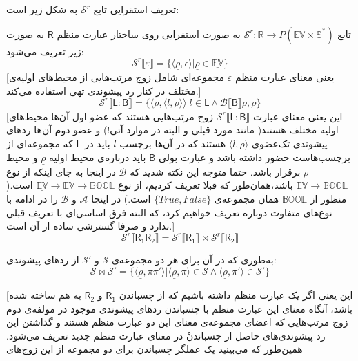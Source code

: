 تعریف استقرایی تابع 
$\mathcal{S}^r$
به شکل زیر است:
\begin{defn}
	تابع 
	$\mathcal{S}^r:\mathbb{R}\rightarrow \mathit{P}(\mathbb{\underline{EV}\times S}^*)$
	به صورت استقرایی روی ساختار عبارت منظم $\mathsf{R}$ به صورت زیر تعریف می‌شود:
$$\mathcal{S}^r\llbracket\varepsilon\rrbracket= \{ \langle \underline{\rho} , \epsilon \rangle | \underline{\rho} \in \underline{\mathbb{EV}}\}$$
[یعنی معنای عبارت منظم
$\varepsilon$
مجموعه‌ای شامل زوج مرتب‌هایی از محیط‌های اولیه‌ی مختلف در کنار رد پیشوندی تهی استفاده می‌کند.]
$$\mathcal{S}^r\llbracket\mathsf{L:B}\rrbracket = \{\langle\underline{\rho},\langle l , \rho \rangle \rangle | l \in \mathsf{L} \land \mathcal{B}\llbracket\mathsf{B}\rrbracket \underline{\rho},\rho \}$$
[این یعنی معنای عبارت 
$\mathcal{S}^r\llbracket\mathsf{L:B}\rrbracket$
زوج مرتب‌هایی هستند که عضو اول آن‌ها محیط‌های اولیه مختلف هستند( مانند مورد قبلی و البته در موارد آتی!) و عضو دوم آن‌ها ردهای پیشوندی تک‌عضوی 
$\langle l , \rho \rangle$
هستند که در آن‌ها برچسب 
$l$
باید در
$\mathsf{L}$
که مجموعه‌ای از برچسب‌هاست حضور داشته باشد و عبارت بولی 
$\mathsf{B}$
باید درباره‌ی محیط اولیه
$\underline{\rho}$
و محیط 
$\rho$
برقرار باشد. حتما متوجه این نکته شدید که 
$\mathcal{B}$
در اینجا به جای اینکه از نوع 
$\mathbb{EV} \rightarrow \mathbb{BOOL}$
باشد،همان‌طور که قبلا تعریف کردیم، از نوع
$\underline{\mathbb{EV}} \rightarrow \mathbb{EV} \rightarrow \mathbb{BOOL}$
است.( منظور از 
$\mathbb{BOOL}$
همان مجموعه‌ی 
$\{True,False\}$
است.) در اینجا 
$\mathcal{A}$
و 
$\mathcal{B}$
را در ادامه با نوع‌های متفاوت دوباره تعریف خواهیم کرد، که البته فرق اساسی‌ای با تعریف قبلی ندارد و صرفا گسترشی ساده از آن است.]
$$\mathcal{S}^r\llbracket\mathsf{R_1 R_2}\rrbracket= \mathcal{S}^r\llbracket\mathsf{R_1}\rrbracket \Join \mathcal{S}^r\llbracket\mathsf{R_2}\rrbracket$$
\begin{center}
	به‌طوری که در آن برای هر دو مجموعه‌ی 
	$\mathcal{S}$
	و
	$\mathcal{S'}$
	از رد‌های پیشوندی:
$$\mathcal{S \Join S'}=
\{
\langle \underline{\rho}, \pi \pi' \rangle |
\langle \underline{\rho},\pi \rangle \in \mathcal{S} \land
\langle \underline{\rho},\pi' \rangle \in \mathcal{S'}
\}
$$
\end{center}
[این یعنی اگر یک عبارت منظم داشته باشیم که از چسباندن 
$\mathsf{R_1}$
و 
$\mathsf{R_2}$
به هم ساخته شده باشد، آنگاه معنای این عبارت منظم با چسباندن ردهای پیشوندی موجود در مولفه‌ی دوم زوج مرتب‌هایی که اعضای مجموعه‌ی معنای این دو عبارت منظم هستند و گذاشتن این رد پیشوندی‌های حاصل از چسباندنْ در معنای عبارت منظم جدید تعریف می‌شود. همین‌طور که می‌بینید یک عملگر چسباندن برای دو مجموعه از این زوج‌های 

\end{defn}
